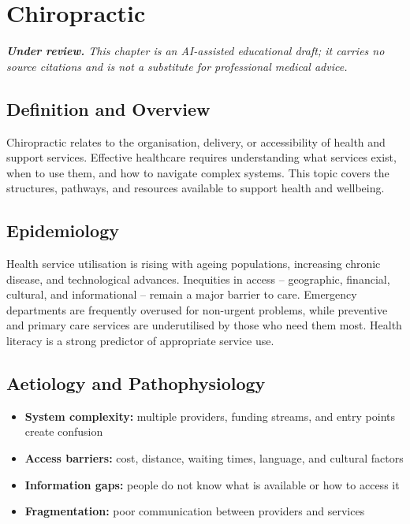 \chapter{Chiropractic}

\medskip
\noindent\textit{\textbf{Under review.} This chapter is an AI-assisted educational draft; it carries no source citations and is not a substitute for professional medical advice.}

\section*{Definition and Overview}
Chiropractic relates to the organisation, delivery, or accessibility of health and support services. Effective healthcare requires understanding what services exist, when to use them, and how to navigate complex systems. This topic covers the structures, pathways, and resources available to support health and wellbeing.

\section*{Epidemiology}
Health service utilisation is rising with ageing populations, increasing chronic disease, and technological advances. Inequities in access -- geographic, financial, cultural, and informational -- remain a major barrier to care. Emergency departments are frequently overused for non-urgent problems, while preventive and primary care services are underutilised by those who need them most. Health literacy is a strong predictor of appropriate service use.

\section*{Aetiology and Pathophysiology}
\begin{itemize}
    \item \textbf{System complexity:} multiple providers, funding streams, and entry points create confusion
    \item \textbf{Access barriers:} cost, distance, waiting times, language, and cultural factors
    \item \textbf{Information gaps:} people do not know what is available or how to access it
    \item \textbf{Fragmentation:} poor communication between providers and services
\end{itemize}

